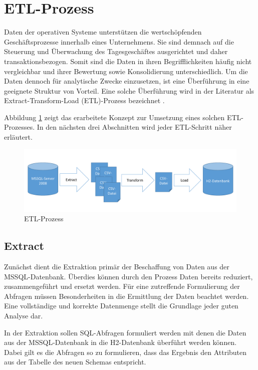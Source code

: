 \section{ETL-Prozess}
\label{ch:konzeption:etl}

Daten der operativen Systeme unterstützen die wertschöpfenden Geschäftsprozesse innerhalb eines Unternehmens. Sie sind demnach auf die Steuerung und Überwachung des Tagesgeschäftes ausgerichtet und daher transaktionsbezogen. Somit sind die Daten in ihren Begrifflichkeiten häufig nicht vergleichbar und ihrer Bewertung sowie Konsolidierung unterschiedlich. Um die Daten dennoch für analytische Zwecke einzusetzen, ist eine Überführung in eine geeignete Struktur von Vorteil. Eine solche Überführung wird in der Literatur als Extract-Transform-Load (ETL)-Prozess bezeichnet \cite{ElSappagh201191}. 

Abbildung \ref{konzept:etl} zeigt das erarbeitete Konzept zur Umsetzung eines solchen ETL-Prozesses. In den nächsten drei Abschnitten wird jeder ETL-Schritt näher erläutert.

\begin{figure}[htbp]
\centering
  \includegraphics[width=1.0\textwidth, width=1.0\textwidth]{pics/ETL.pdf}
\caption{ETL-Prozess}
\label{konzept:etl}
\end{figure} 


\subsection{Extract}

Zunächst dient die Extraktion primär der Beschaffung von Daten aus der MSSQL-Datenbank. Überdies können durch den Prozess Daten bereits reduziert,  zusammengeführt und ersetzt werden. Für eine zutreffende Formulierung der Abfragen müssen Besonderheiten in die Ermittlung der Daten beachtet werden. Eine vollständige und korrekte Datenmenge stellt die Grundlage jeder guten Analyse dar.

In der Extraktion sollen SQL-Abfragen formuliert werden mit denen die Daten aus der MSSQL-Datenbank in die H2-Datenbank überführt werden können. Dabei gilt es die Abfragen so zu formulieren, dass das Ergebnis den Attributen aus der Tabelle des neuen Schemas entspricht.


